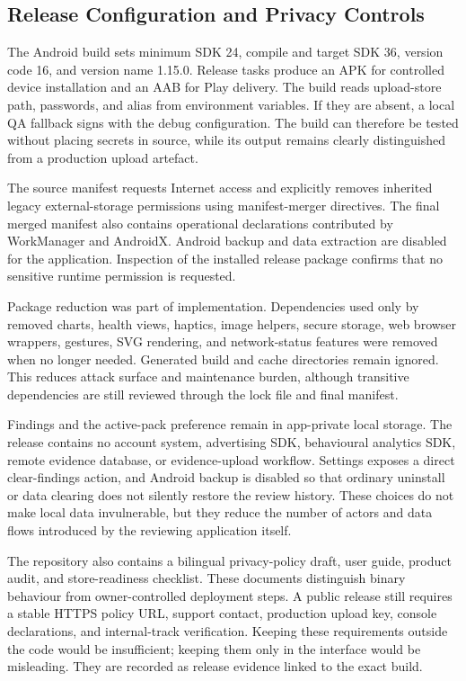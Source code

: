 \subsection{Release Configuration and Privacy Controls}

The Android build sets minimum SDK 24, compile and target SDK 36, version code 16, and version name 1.15.0. Release tasks produce an APK for controlled device installation and an AAB for Play delivery. The build reads upload-store path, passwords, and alias from environment variables. If they are absent, a local QA fallback signs with the debug configuration. The build can therefore be tested without placing secrets in source, while its output remains clearly distinguished from a production upload artefact.

The source manifest requests Internet access and explicitly removes inherited legacy external-storage permissions using manifest-merger directives. The final merged manifest also contains operational declarations contributed by WorkManager and AndroidX. Android backup and data extraction are disabled for the application. Inspection of the installed release package confirms that no sensitive runtime permission is requested.

Package reduction was part of implementation. Dependencies used only by removed charts, health views, haptics, image helpers, secure storage, web browser wrappers, gestures, SVG rendering, and network-status features were removed when no longer needed. Generated build and cache directories remain ignored. This reduces attack surface and maintenance burden, although transitive dependencies are still reviewed through the lock file and final manifest.

Findings and the active-pack preference remain in app-private local storage. The release contains no account system, advertising SDK, behavioural analytics SDK, remote evidence database, or evidence-upload workflow. Settings exposes a direct clear-findings action, and Android backup is disabled so that ordinary uninstall or data clearing does not silently restore the review history. These choices do not make local data invulnerable, but they reduce the number of actors and data flows introduced by the reviewing application itself.

The repository also contains a bilingual privacy-policy draft, user guide, product audit, and store-readiness checklist. These documents distinguish binary behaviour from owner-controlled deployment steps. A public release still requires a stable HTTPS policy URL, support contact, production upload key, console declarations, and internal-track verification. Keeping these requirements outside the code would be insufficient; keeping them only in the interface would be misleading. They are recorded as release evidence linked to the exact build.


